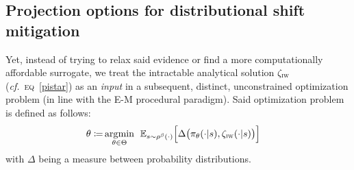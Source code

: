 \subsection{Projection options for distributional shift mitigation}
\label{projectionoptions}

Yet, instead of trying to relax said evidence or find a more computationally affordable surrogate,
we treat the intractable analytical solution $\zeta_\textsc{iw}$ (\textit{cf.}~\textsc{eq}~\ref{pistar})
as an \textit{input} in a subsequent, distinct, unconstrained optimization problem (in line with the E-M
procedural paradigm). Said optimization problem is defined as follows:
\begin{align}
  \theta \coloneqq
  &\operatorname*{\arg\!\min}_{\theta \in \Theta} \;\,
  \mathbb{E}_{s \sim \rho^\beta(\cdot)}
  \Big[
  \Delta\big(\pi_\theta(\cdot | s), \zeta_\textsc{iw}(\cdot | s)\big)
  \Big]
  \label{piobjectivenew}
\end{align}
with $\Delta$ being a measure between probability distributions.

